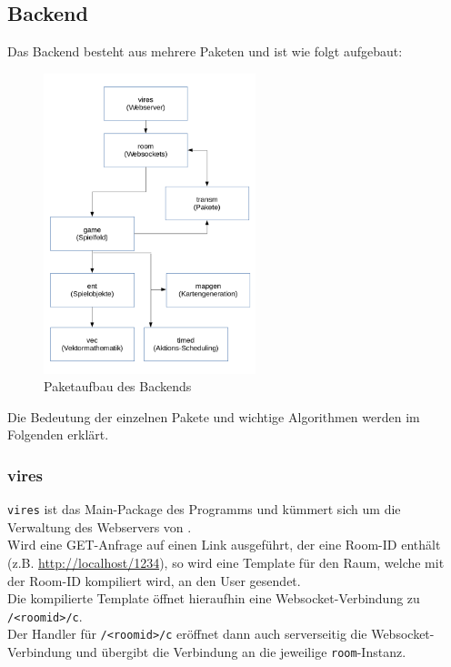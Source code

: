 \subsection{Backend}
Das Backend besteht aus mehrere Paketen und ist wie folgt aufgebaut:
\begin{figure}[H]
	\centering
	\includegraphics[width=0.55\textwidth]{Architektur.png}
	\caption{Paketaufbau des Backends}
\end{figure}
Die Bedeutung der einzelnen Pakete und wichtige Algorithmen werden im Folgenden erklärt.

\subsubsection{vires}
\verb+vires+ ist das Main-Package des Programms und kümmert sich um die Verwaltung des Webservers von \vires. \\
Wird eine GET-Anfrage auf einen Link ausgeführt, der eine Room-ID enthält (z.B. \url{http://localhost/1234}), so wird eine Template für den Raum, welche mit der Room-ID kompiliert wird, an den User gesendet. \\
Die kompilierte Template öffnet hieraufhin eine Websocket-Verbindung zu \verb+/<roomid>/c+. \\
Der Handler für \verb+/<roomid>/c+ eröffnet dann auch serverseitig die Websocket-Verbindung und übergibt die Verbindung an die jeweilige \verb+room+-Instanz.

